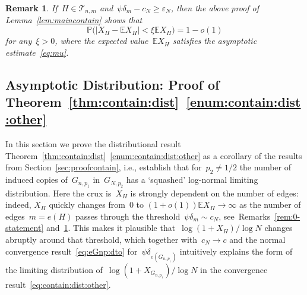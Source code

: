 \documentclass{article}
\newcommand{\eps}{\varepsilon}
\renewcommand{\Pr}{\mathbb{P}}
\newcommand{\E}{\mathbb{E}}
\newcommand{\cT}{\mathcal{T}}
\newtheorem{remark}{Remark}
\newcommand\bigpar[1]{\bigl(#1\bigr)}
\newcommand{\refT}[1]{Theorem~\ref{#1}}
\newcommand{\refL}[1]{Lemma~\ref{#1}}
\newcommand{\refS}[1]{Section~\ref{#1}}
\begin{document}
\begin{remark}\label{rem:maincontain}If~$H \in \cT_{n,m}$ and~${\psi\delta_m-c_N \ge \eps_N}$, 
then the above proof of \refL{lem:maincontain} shows that 
\begin{equation*}\label{eq:secondmoment:refined}
\Pr\bigpar{|X_H-\E X_H| < \xi \E X_H} = 1-o(1)
\end{equation*}
for any~$\xi>0$, 
where the expected value~$\E X_H$ satisfies the asymptotic estimate~\eqref{eq:mu}. 
\end{remark}




\subsection{Asymptotic Distribution: Proof of \refT{thm:contain:dist}~\ref{enum:contain:dist:other}}\label{sec:contain:dist}
In this section we prove the distributional result \refT{thm:contain:dist}~\ref{enum:contain:dist:other}
as a corollary of the results from \refS{sec:proofcontain}, i.e., establish that for~$p_2 \neq 1/2$ the number of induced copies of~$G_{n,p_1}$ in~$G_{N,p_2}$ has a `squashed' log-normal limiting distribution.
Here the crux is~$X_H$ is strongly dependent on the number of edges: indeed, $X_H$ quickly changes from~$0$ to $(1+o(1)) \E X_H \to \infty$ as the number of edges~$m=e(H)$ passes through the threshold~${\psi\delta_m \sim c_N}$, see~Remarks~\ref{rem:0-statement} and~\ref{rem:maincontain}. 
This makes it plausible that~${\log(1+X_H)/\log N}$ changes abruptly around that threshold, which together with~$c_N \to c$ and the normal convergence result~\eqref{eq:eGnp:dto} for~$\psi\delta_{e(G_{n,p_1})}$
intuitively explains the form of the limiting distribution of~$\log(1+X_{G_{n,p_1}})/\log N$ in the convergence result~\eqref{eq:contain:dist:other}. 
\end{document}
